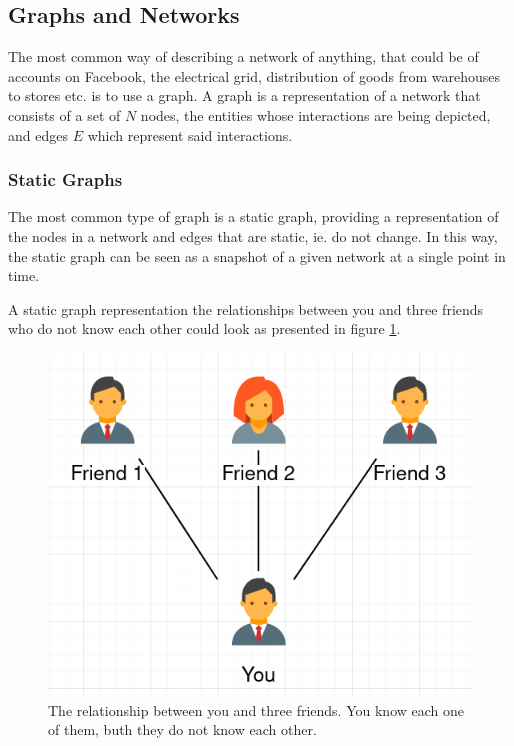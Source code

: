 \subsection{Graphs and Networks}
\label{sec:Method:Graphs}
The most common way of describing a network of anything, that could be of accounts on Facebook, the electrical grid, distribution of goods from warehouses to stores etc. is to use a graph.
A graph is a representation of a network that consists of a set of $N$ nodes, the entities whose interactions are being depicted, and edges $E$ which represent said interactions.


\subsubsection{Static Graphs}
\label{sec:Method:Graphs:StaticGraphs}
The most common type of graph is a static graph, providing a representation of the nodes in a network and edges that are static, ie. do not change. 
In this way, the static graph can be seen as a snapshot of a given network at a single point in time.

A static graph representation the relationships between you and three friends who do not know each other could look as presented in figure \ref{fig:StaticGraph}.

\begin{figure}[H]
    \centering
    \includegraphics[width=\textwidth]{0_images/static_graph.png}
    \caption{The relationship between you and three friends. You know each one of them, buth they do not know each other.}
    \label{fig:StaticGraph}
\end{figure}


